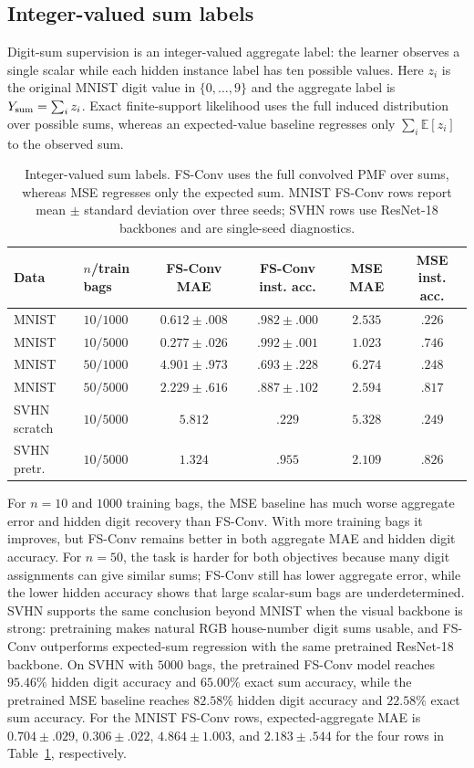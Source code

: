 \subsection{Integer-valued sum labels}

Digit-sum supervision is an integer-valued aggregate label: the learner observes a single scalar while each hidden instance label has ten possible values.
Here $z_i$ is the original MNIST digit value in $\{0,\ldots,9\}$ and the aggregate label is $Y_{\rm sum}=\sum_i z_i$.
Exact finite-support likelihood uses the full induced distribution over possible sums, whereas an expected-value baseline regresses only $\sum_i \mathbb{E}[z_i]$ to the observed sum.

\begin{table}[t]
\centering
\small
\caption{Integer-valued sum labels.  FS-Conv uses the full convolved PMF over sums, whereas MSE regresses only the expected sum.  MNIST FS-Conv rows report mean $\pm$ standard deviation over three seeds; SVHN rows use ResNet-18 backbones and are single-seed diagnostics.}
\label{tab:digit-sum}
\begin{tabular}{llcccc}
\toprule
Data & $n$/train bags & FS-Conv MAE & FS-Conv inst. acc. & MSE MAE & MSE inst. acc. \\
\midrule
MNIST & $10/1000$ & $0.612{\pm}.008$ & $.982{\pm}.000$ & $2.535$ & $.226$ \\
MNIST & $10/5000$ & $0.277{\pm}.026$ & $.992{\pm}.001$ & $1.023$ & $.746$ \\
MNIST & $50/1000$ & $4.901{\pm}.973$ & $.693{\pm}.228$ & $6.274$ & $.248$ \\
MNIST & $50/5000$ & $2.229{\pm}.616$ & $.887{\pm}.102$ & $2.594$ & $.817$ \\
SVHN scratch & $10/5000$ & $5.812$ & $.229$ & $5.328$ & $.249$ \\
SVHN pretr. & $10/5000$ & $1.324$ & $.955$ & $2.109$ & $.826$ \\
\bottomrule
\end{tabular}
\end{table}

For $n=10$ and $1000$ training bags, the MSE baseline has much worse aggregate error and hidden digit recovery than FS-Conv.
With more training bags it improves, but FS-Conv remains better in both aggregate MAE and hidden digit accuracy.
For $n=50$, the task is harder for both objectives because many digit assignments can give similar sums; FS-Conv still has lower aggregate error, while the lower hidden accuracy shows that large scalar-sum bags are underdetermined.
SVHN supports the same conclusion beyond MNIST when the visual backbone is strong: pretraining makes natural RGB house-number digit sums usable, and FS-Conv outperforms expected-sum regression with the same pretrained ResNet-18 backbone.
On SVHN with $5000$ bags, the pretrained FS-Conv model reaches $95.46\%$ hidden digit accuracy and $65.00\%$ exact sum accuracy, while the pretrained MSE baseline reaches $82.58\%$ hidden digit accuracy and $22.58\%$ exact sum accuracy.
For the MNIST FS-Conv rows, expected-aggregate MAE is $0.704{\pm}.029$, $0.306{\pm}.022$, $4.864{\pm}1.003$, and $2.183{\pm}.544$ for the four rows in Table~\ref{tab:digit-sum}, respectively.

